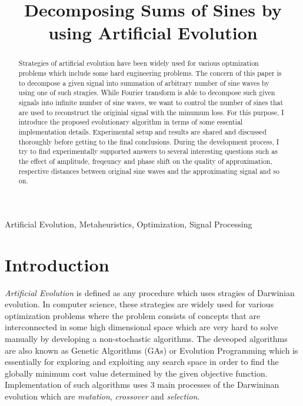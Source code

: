\documentclass[conference]{IEEEtran}
\begin{document}
\title{Decomposing Sums of Sines by using Artificial Evolution\\
}

\author{
}

\maketitle

\begin{abstract}
	Strategies of artificial evolution have been widely used for various optmization problems which include some hard engineering problems. The concern of this paper is to decompose a given signal into 
	summation of arbitrary number of sine waves by using one of such stragies. While Fourier transform is able to decompose such given signals into infinite number of sine waves, we want to control the 
	number of sines that are used to reconstruct the originial signal with the minumum loss. For this purpose, I introduce the proposed evolutionary algorithm in terms of some essential implementation details. 
	Experimental setup and results are shared and discussed thoroughly before getting to the final conclusions. During the development process, I try to find experimentally supported answers to several 
	interesting questions such as the effect of amplitude, freqeuncy and phase shift on the quality of approximation, respective distances between original sine waves and the approximating signal and so on.
\end{abstract}

\begin{IEEEkeywords}
	Artificial Evolution, Metaheuristics, Optimization, Signal Processing 
\end{IEEEkeywords}

\section{Introduction}
\textit{Artificial Evolution} is defined as any procedure which uses stragies of Darwinian evolution. In computer science, these strategies are widely used for various optimization problems where the problem 
consists of concepts that are interconnected in some high dimensional space which are very hard to solve manually by developing a non-stochastic algorithms. The deveoped algorithms are also known as 
Genetic Algorithms (GAs) or Evolution Programming which is essentially for exploring and exploiting any search space in order to find the globally minimum cost value determined by the given objective 
function. Implementation of such algorithms uses 3 main processes of the Darwininan evolution which are \textit{mutation}, \textit{crossover} and \textit{selection}.
\end{document}
